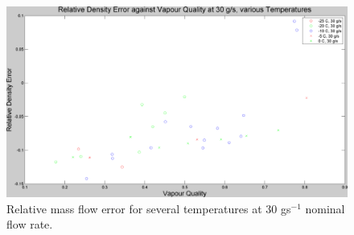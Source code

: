 \documentclass{report}
\begin{document}
\begin{figure}
\includegraphics[width=\textwidth]{plots/fig8}
\caption{Relative mass flow error for several temperatures at 30 gs$^{-1}$ nominal flow rate.}
\label{plot:8}
\end{figure}
\FloatBarrier
\end{document}
